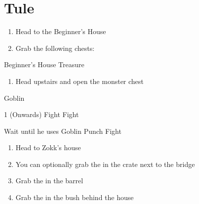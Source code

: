 \newpage
\chapter{Tule}

\vspace{\baselineskip}

\begin{paracol}{2}

\begin{enumerate}
    \item Head to the Beginner's House
    \item Grab the following chests:  
\end{enumerate}

\switchcolumn
\begin{misc}{Beginner's House Treasure}
\end{misc}

\switchcolumn
\resume
\begin{enumerate}[resume]
    \item Head upstairs and open the monster chest
\end{enumerate}

\begin{encounter}{Goblin}
    \varwb
    \begin{round}{1 (Onwards)}
        \bartz Fight \pointRight \space {}
        \lenna Fight \pointRight \space {}
        \item {}
        \vspace{1mm}
        \item[] 
        \item Wait until he uses Goblin Punch
        \galuf Fight
    \end{round}
    \varwe
\end{encounter}

\begin{enumerate}[resume]
    \item Head to Zokk's house
    \item You can optionally grab the  in the crate next to the bridge
    \item Grab the  in the barrel
    \item Grab the  in the bush behind the house
\end{enumerate}


\end{paracol}
